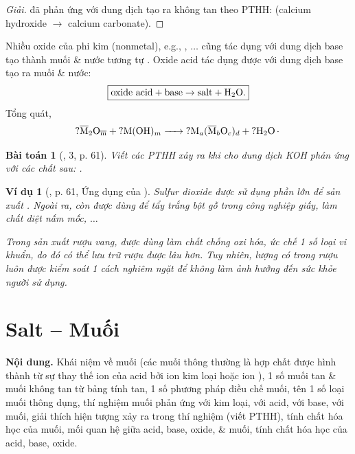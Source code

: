 \documentclass{article}
\newtheorem{baitoan}{Bài toán}
\newtheorem{vidu}{Ví dụ}
\begin{document}
\begin{proof}[Giải]
	 đã phản ứng với dung dịch  tạo ra  không tan theo PTHH:  (calcium hydroxide $\to$ calcium carbonate).
\end{proof}
Nhiều oxide của phi kim (nonmetal), e.g., , $\ldots$ cũng tác dụng với dung dịch base tạo thành muối \& nước tương tự . Oxide acid tác dụng được với dung dịch base tạo ra muối \& nước:
\begin{align}
	\label{oxide acid + base}
	\boxed{\mbox{oxide acid} + \mbox{base}\to\mbox{salt} + \ce{H2O}.}
\end{align}
Tổng quát,
\begin{align}
	\ce{$?$\overline{\rm M}2O_{\overline{m}} + $?$M(OH)_m -> $?$M_a(\overline{\rm M}_bO_c)_d + $?$H2O.}
\end{align}

\begin{baitoan}[\cite{SGK_KHTN_8_Canh_Dieu}, 3, p. 61]
	Viết các PTHH xảy ra khi cho dung dịch \emph{KOH} phản ứng với các chất sau: \emph{}.
\end{baitoan}

\begin{vidu}[\cite{SGK_KHTN_8_Canh_Dieu}, p. 61, Ứng dụng của ]
	Sulfur dioxide \emph{} được sử dụng phần lớn để sản xuất \emph{}. Ngoài ra, \emph{} còn được dùng để tẩy trắng bột gỗ trong công nghiệp giấy, làm chất diệt nấm mốc, $\ldots$
	
	Trong sản xuất rượu vang, \emph{} được dùng làm chất chống oxi hóa, ức chế 1 số loại vi khuẩn, do đó có thể lưu trữ rượu được lâu hơn. Tuy nhiên, lượng \emph{} có trong rượu luôn được kiểm soát 1 cách nghiêm ngặt để không làm ảnh hưởng đến sức khỏe người sử dụng.
\end{vidu}

\noindent{}


\section{Salt -- Muối}
\textsf{\textbf{Nội dung.} Khái niệm về muối (các muối thông thường là hợp chất được hình thành từ sự thay thế ion  của acid bởi ion kim loại hoặc ion ), 1 số muối tan \& muối không tan từ bảng tính tan, 1 số phương pháp điều chế muối, tên 1 số loại muối thông dụng, thí nghiệm muối phản ứng với kim loại, với acid, với base, với muối, giải thích hiện tượng xảy ra trong thí nghiệm (viết PTHH), tính chất hóa học của muối, mối quan hệ giữa acid, base, oxide, \& muối, tính chất hóa học của acid, base, oxide.}
\end{document}
